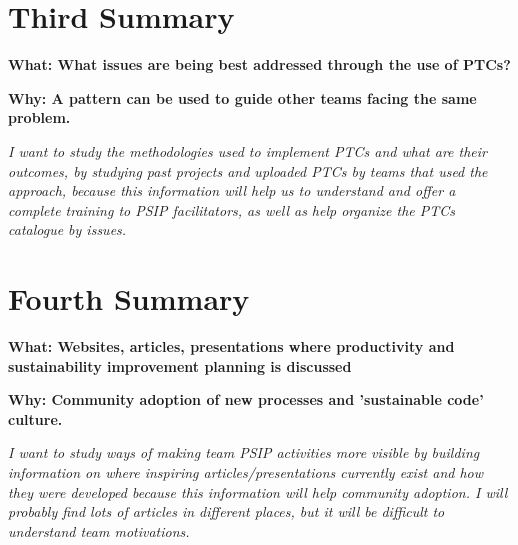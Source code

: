 \documentclass[a4paper]{article}
\begin{document}

\section{Third Summary}
\textbf {What: What issues are being best addressed through the use of PTCs?} \par
\textbf {Why: A pattern can be used to guide other teams facing the same problem.} \par
\textit{I want to study the methodologies used to implement PTCs and what are their outcomes, by studying past projects and uploaded PTCs by teams that used the approach, because this information will help us to understand and offer a complete training to PSIP facilitators, as well as help organize the PTCs catalogue by issues.}




\section{Fourth Summary}
\textbf {What: Websites, articles, presentations where productivity and sustainability improvement planning is discussed} \par
\textbf {Why: Community adoption of new processes and 'sustainable code' culture.} \par
\textit{I want to study ways of making team PSIP activities more visible by building information on where inspiring articles/presentations currently exist and how they were developed  because this information will help community adoption. I will probably find lots of articles in different places, but it will be difficult to understand team motivations.}



\end{document}
